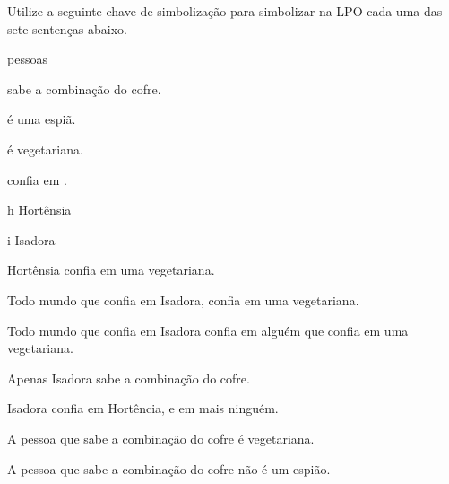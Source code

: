 \problempart
Utilize a seguinte chave de simbolização para simbolizar na LPO cada uma das sete sentenças abaixo.
\begin{center}
\begin{ekey}
\item[\text{domínio}] pessoas
\item[\atom{S}{x}]  sabe a combinação do cofre.
\item[\atom{E}{x}]  é uma espiã.
\item[\atom{V}{x}]  é vegetariana.
\item[\atom{C}{x,y}]  confia em .
\item[h] Hortênsia
\item[i] Isadora
\end{ekey}
\end{center}
\begin{earg}
\item Hortênsia confia em uma vegetariana.
\item Todo mundo que confia em Isadora, confia em uma vegetariana.
\item Todo mundo que confia em Isadora confia em alguém que confia em uma vegetariana.
\item Apenas Isadora sabe a combinação do cofre.
\item Isadora confia em Hortência, e em mais ninguém.
\item A pessoa que sabe a combinação do cofre é vegetariana.
\item A pessoa que sabe a combinação do cofre não é um espião.
\end{earg}


